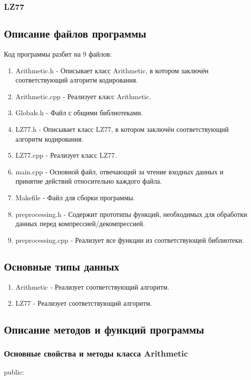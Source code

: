 \documentclass[12pt]{article}
\begin{document}
\subsubsection*{LZ77}%

\subsection*{Описание файлов программы}

Код программы разбит на 9 файлов:

\begin{enumerate}
	\item Arithmetic.h - Описывает класс Arithmetic, в котором заключён соответствующий алгоритм кодирования. 
	\item Arithmetic.cpp - Реализует класс Arithmetic.
	\item Globals.h - Файл с общими библиотеками.
	\item LZ77.h - Описывает класс LZ77, в котором заключён соответствующий алгоритм кодирования.
	\item LZ77.cpp - Реализует класс LZ77.
	\item main.cpp - Основной файл, отвечающий за чтение входных данных и принятие действий относительно каждого файла.
	\item Makefile - Файл для сборки программы.
	\item preprocessing.h - Содержит прототипы функций, необходимых для обработки данных перед компрессией/декомпрессией.
	\item preprocessing.cpp - Реализует все функции из соответствующей библиотеки.
\end{enumerate}

\subsection*{Основные типы данных}

\begin{enumerate}
	\item Arithmetic - Реализует соответствующий алгоритм.
	\item LZ77 - Реализует соответствующий алгоритм.
\end{enumerate}

\subsection*{Описание методов и функций программы}
 
\subsubsection*{Основные свойства и методы класса Arithmetic}
\noindent
public:
\end{document}
